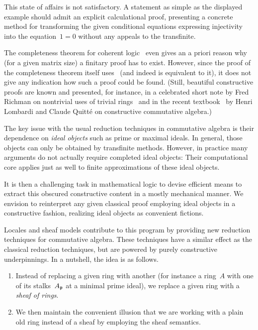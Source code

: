 \documentclass{ws-rv9x6}
\begin{document}
{This state of affairs is not satisfactory. A statement as simple as the
displayed example should admit an explicit calculational proof, presenting a
concrete method for transforming the given conditional equations expressing
injectivity into the equation~$1 = 0$ without any appeals to the transfinite.

The completeness theorem for coherent logic~\cite[Corollary~D1.5.10]{johnstone:elephant} even
gives an a priori reason why (for a given matrix size) a finitary proof has to
exist. However, since the proof of the completeness theorem itself uses~\BPIT
(and indeed is equivalent to it), it does not give any indication how such a
proof could be found. (Still, beautiful constructive proofs are known and
presented, for instance, in a celebrated short note by Fred Richman on nontrivial
uses of trivial rings~\cite{richman:trivial-rings} and in the recent
textbook~\cite{lombardi-quitte:constructive-algebra} by Henri Lombardi and
Claude Quitté on constructive commutative algebra.)

The key issue with the usual reduction techniques in commutative algebra is
their dependence on \emph{ideal objects} such as prime or maximal ideals. In
general, those objects can only be obtained by transfinite methods. However, in
practice many arguments do not actually require completed ideal objects:
Their computational core applies just as well to finite approximations of
these ideal objects.

It is then a challenging task in mathematical logic to devise efficient means to
extract this obscured constructive content in a mostly mechanical manner. We
envision to reinterpret any given classical proof employing ideal objects in a
constructive fashion, realizing ideal objects as convenient fictions.

Locales and sheaf models contribute to this program by providing new reduction
techniques for commutative algebra. These techniques have a similar effect as the
classical reduction techniques, but are powered by purely constructive
underpinnings. In a nutshell, the idea is as follows.

\begin{enumerate}
\item Instead of replacing a given ring with another (for instance a ring~$A$ with
one of its stalks~$A_{\mathfrak{p}}$ at a minimal prime ideal), we replace a given ring
with a \emph{sheaf of rings}.
\item We then maintain the convenient illusion that we are working with a plain old ring
instead of a sheaf by employing the sheaf semantics.
\end{enumerate}

}
\end{document}
